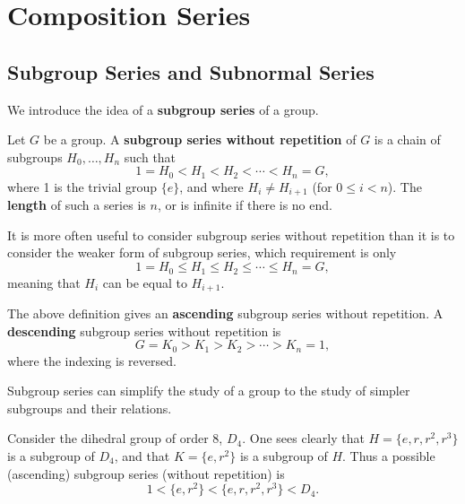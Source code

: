\chapter{Composition Series}
\section{Subgroup Series and Subnormal Series}
We introduce the idea of a \textbf{subgroup series} of a group.
\begin{definition}
    Let $G$ be a group. A \textbf{subgroup series without repetition} of $G$ is a chain of subgroups $H_0, \dots, H_n$ such that
    \[
        1 = H_0 < H_1 < H_2 < \cdots < H_n = G,
    \]
    where 1 is the trivial group $\{e\}$, and where $H_i \neq H_{i+1}$ (for $0 \leq i < n$). The \textbf{length} of such a series is $n$, or is infinite if there is no end.
\end{definition}
\begin{remark}
    It is more often useful to consider subgroup series without repetition than it is to consider the weaker form of subgroup series, which requirement is only
    \[
        1 = H_0 \leq H_1 \leq H_2 \leq \cdots \leq H_n = G,
    \]
    meaning that $H_i$ can be equal to $H_{i+1}$.
\end{remark}
\begin{remark}
    The above definition gives an \textbf{ascending} subgroup series without repetition. A \textbf{descending} subgroup series without repetition is
    \[
        G = K_0 > K_1 > K_2 > \cdots > K_n = 1,
    \]
    where the indexing is reversed.
\end{remark}

Subgroup series can simplify the study of a group to the study of simpler subgroups and their relations.

\begin{example}
    Consider the dihedral group of order 8, $D_4$. One sees clearly that $H = \{e, r, r^2, r^3\}$ is a subgroup of $D_4$, and that $K = \{e, r^2\}$ is a subgroup of $H$. Thus a possible (ascending) subgroup series (without repetition) is
    \[
        1 < \{e, r^2\} < \{e, r, r^2, r^3\} < D_4.
    \]
\end{example}

